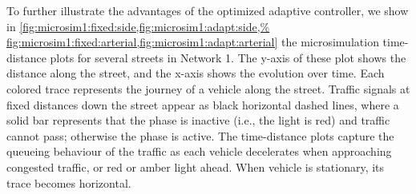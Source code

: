 
To further illustrate the advantages of the optimized adaptive controller, we show
in \cref{fig:microsim1:fixed:side,fig:microsim1:adapt:side,%
fig:microsim1:fixed:arterial,fig:microsim1:adapt:arterial} the microsimulation
time-distance plots for several streets in Network 1.
%
The y-axis of these plot shows the distance along the street, and the x-axis
shows the evolution over time.
%
Each colored trace represents the journey of a vehicle along the street.
%
Traffic signals at fixed distances down the street appear as black horizontal
dashed lines, where a solid bar represents that the phase is inactive (i.e., the
light is red) and traffic cannot pass; otherwise the phase is active.
%
%
The time-distance plots capture the queueing behaviour of the traffic as each
vehicle decelerates when approaching congested traffic, or red or amber light
ahead.
%
When vehicle is stationary, its trace becomes horizontal.


